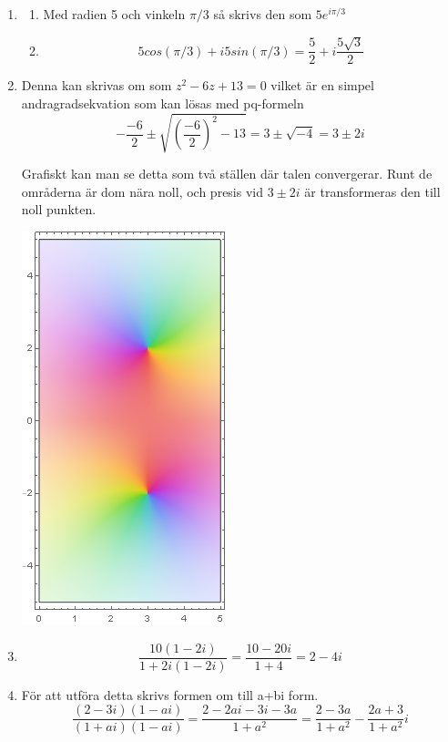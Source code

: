 \documentclass[a4paper,12pt]{article}
\begin{document}
\begin{enumerate}
\begin{enumerate}
          \end{enumerate}
          \item \begin{enumerate}
                \item Med radien 5 och vinkeln $\pi/3$ så 
                skrivs den som $5e^{i\pi/3}$

                \item $$5cos(\pi/3)+i5sin(\pi/3)=\frac{5}{2}+i\frac{5\sqrt{3}}{2}$$
          \end{enumerate}

          \item Denna kan skrivas om som 
          $z^2-6z+13=0$ vilket är en simpel andragradsekvation som
          kan lösas med pq-formeln 
          $$-\frac{-6}{2}\pm\sqrt{(\frac{-6}{2})^2-13}=3\pm\sqrt{-4}=3\pm 2i$$
          
          Grafiskt kan man se detta som två ställen där talen convergerar.
          Runt de områderna är dom nära noll, och presis vid $3\pm 2i$ är 
          transformeras den till noll punkten.
          \begin{center}
                \includegraphics[scale=0.6]{Figur 2.png}
          \end{center}
          \item 
          $$\frac{10(1-2i)}{1+2i(1-2i)}=\frac{10-20i}{1+4}=2-4i$$

          \item För att utföra detta skrivs formen om till a+bi form.
          $$\frac{(2-3i)(1-ai)}{(1+ai)(1-ai)}=\frac{2-2ai-3i-3a}{1+a^2}=\frac{2-3a}{1+a^2}-\frac{2a+3}{1+a^2}i$$


\end{enumerate}
\end{document}
